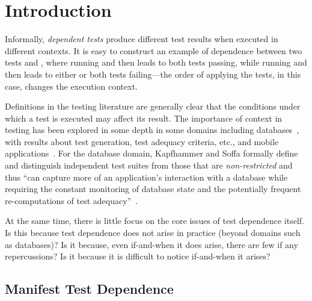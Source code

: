 \section{Introduction}

Informally, \emph{dependent tests} produce different test results when
executed in different contexts. %
It is easy to
construct an example of dependence between two tests 
and , where running  and then  leads
to both tests passing, while running  and then
 leads to either or both tests failing---the order
of applying the tests, in this case, changes the execution context.


Definitions in the testing literature are generally clear that the
conditions under which a test is executed may affect its result.  The
importance of context in testing has been explored in some depth in
some domains including databases~\cite{Gray:1994:QGB:191843.191886,Chays:2000:FTD:347324.348954,
kapfhammeretal:FSE:2003}, with results about test
generation, test adequacy criteria, etc., and mobile
applications~\cite{Wang:2007:AGC}.
For the database domain, Kapfhammer and Soffa formally
define and distinguish independent test suites from those that are
\emph{non-restricted\/} and thus ``can capture more of an application's
interaction with a database while requiring the constant monitoring of
database state and the potentially frequent re-computations of test
adequacy''~\cite[p.~101]{kapfhammeretal:FSE:2003}.

At the same time, there is little focus on the core
issues of
test dependence itself.
Is this because test dependence does
not arise in practice (beyond domains such as databases)?  Is it because, even if-and-when it does arise, there
are few if any repercussions?  Is it because it is difficult to
notice if-and-when it arises?

\subsection{Manifest Test Dependence}

